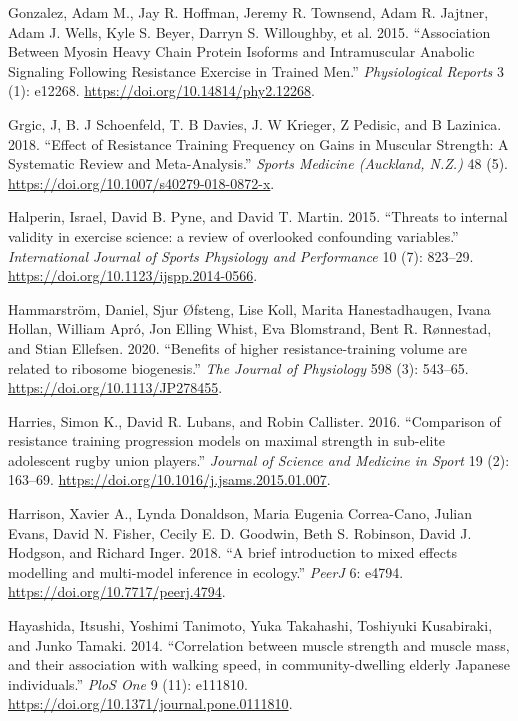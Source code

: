 \documentclass[
  letterpaper,
  DIV=11,
  numbers=noendperiod]{scrreprt}
\newlength{\cslhangindent}
\newlength{\cslentryspacingunit} %
\newenvironment{CSLReferences}[2] %
 {%
  \setlength{\parindent}{0pt}
  \ifodd #1
  \let\oldpar\par
  \def\par{\hangindent=\cslhangindent\oldpar}
  \fi
  \setlength{\parskip}{#2\cslentryspacingunit}
 }%
 {}
\begin{document}
\begin{CSLReferences}{1}{0}
\leavevmode{}%
Gonzalez, Adam M., Jay R. Hoffman, Jeremy R. Townsend, Adam R. Jajtner,
Adam J. Wells, Kyle S. Beyer, Darryn S. Willoughby, et al. 2015.
{``Association Between Myosin Heavy Chain Protein Isoforms and
Intramuscular Anabolic Signaling Following Resistance Exercise in
Trained Men.''} \emph{Physiological Reports} 3 (1): e12268.
\url{https://doi.org/10.14814/phy2.12268}.

\leavevmode{}%
Grgic, J, B. J Schoenfeld, T. B Davies, J. W Krieger, Z Pedisic, and B
Lazinica. 2018. {``Effect of Resistance Training Frequency on Gains in
Muscular Strength: A Systematic Review and Meta-Analysis.''}
\emph{Sports Medicine (Auckland, N.Z.)} 48 (5).
\url{https://doi.org/10.1007/s40279-018-0872-x}.

\leavevmode{}%
Halperin, Israel, David B. Pyne, and David T. Martin. 2015. {``Threats
to internal validity in exercise science: a review of overlooked
confounding variables.''} \emph{International Journal of Sports
Physiology and Performance} 10 (7): 823--29.
\url{https://doi.org/10.1123/ijspp.2014-0566}.

\leavevmode{}%
Hammarström, Daniel, Sjur Øfsteng, Lise Koll, Marita Hanestadhaugen,
Ivana Hollan, William Apró, Jon Elling Whist, Eva Blomstrand, Bent R.
Rønnestad, and Stian Ellefsen. 2020. {``Benefits of higher
resistance-training volume are related to ribosome biogenesis.''}
\emph{The Journal of Physiology} 598 (3): 543--65.
\url{https://doi.org/10.1113/JP278455}.

\leavevmode{}%
Harries, Simon K., David R. Lubans, and Robin Callister. 2016.
{``Comparison of resistance training progression models on maximal
strength in sub-elite adolescent rugby union players.''} \emph{Journal
of Science and Medicine in Sport} 19 (2): 163--69.
\url{https://doi.org/10.1016/j.jsams.2015.01.007}.

\leavevmode{}%
Harrison, Xavier A., Lynda Donaldson, Maria Eugenia Correa-Cano, Julian
Evans, David N. Fisher, Cecily E. D. Goodwin, Beth S. Robinson, David J.
Hodgson, and Richard Inger. 2018. {``A brief introduction to mixed
effects modelling and multi-model inference in ecology.''} \emph{PeerJ}
6: e4794. \url{https://doi.org/10.7717/peerj.4794}.

\leavevmode{}%
Hayashida, Itsushi, Yoshimi Tanimoto, Yuka Takahashi, Toshiyuki
Kusabiraki, and Junko Tamaki. 2014. {``Correlation between muscle
strength and muscle mass, and their association with walking speed, in
community-dwelling elderly Japanese individuals.''} \emph{PloS One} 9
(11): e111810. \url{https://doi.org/10.1371/journal.pone.0111810}.


\end{CSLReferences}
\end{document}
